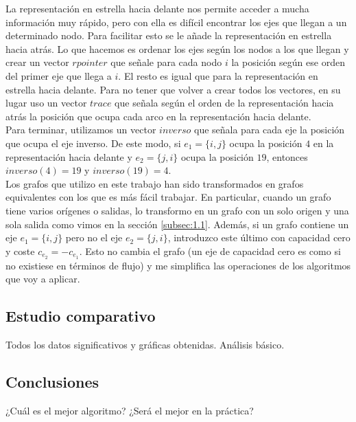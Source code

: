 La representación en estrella hacia delante nos permite acceder a mucha información muy rápido, pero con ella es difícil encontrar los ejes que llegan a un determinado nodo.
Para facilitar esto se le añade la representación en estrella hacia atrás.
Lo que hacemos es ordenar los ejes según los nodos a los que llegan y crear un vector $rpointer$ que señale para cada nodo $i$ la posición según ese orden del primer eje que llega a $i$.
El resto es igual que para la representación en estrella hacia delante.
Para no tener que volver a crear todos los vectores, en su lugar uso un vector $trace$ que señala según el orden de la representación hacia atrás la posición que ocupa cada arco en la representación hacia delante.\\

Para terminar, utilizamos un vector $inverso$ que señala para cada eje la posición que ocupa el eje inverso.
De este modo, si $e_1=\{i,j\}$ ocupa la posición $4$ en la representación hacia delante y $e_2=\{j,i\}$ ocupa la posición $19$, entonces $inverso(4)=19$ y $inverso(19)=4$.\\

Los grafos que utilizo en este trabajo han sido transformados en grafos equivalentes con los que es más fácil trabajar.
En particular, cuando un grafo tiene varios orígenes o salidas, lo transformo en un grafo con un solo origen y una sola salida como vimos en la sección \ref{subsec:1.1}.
Además, si un grafo contiene un eje $e_1=\{i,j\}$ pero no el eje $e_2=\{j,i\}$, introduzco este último con capacidad cero y coste $c_{e_2} = - c_{e_1}$.
Esto no cambia el grafo (un eje de capacidad cero es como si no existiese en términos de flujo) y me simplifica las operaciones de los algoritmos que voy a aplicar.

\subsection{Estudio comparativo}
Todos los datos significativos y gráficas obtenidas. Análisis básico.


\subsection{Conclusiones}
¿Cuál es el mejor algoritmo? ¿Será el mejor en la práctica?

